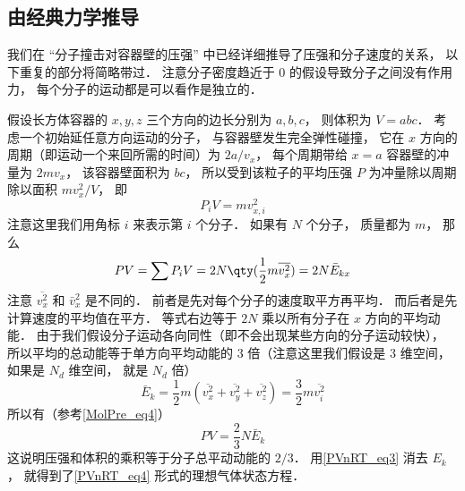 \subsection{由经典力学推导}

我们在 “分子撞击对容器壁的压强” 中已经详细推导了压强和分子速度的关系， 以下重复的部分将简略带过． 注意分子密度趋近于 0 的假设导致分子之间没有作用力， 每个分子的运动都是可以看作是独立的．

假设长方体容器的 $x, y, z$ 三个方向的边长分别为 $a, b, c$， 则体积为  $V = abc$． 考虑一个初始延任意方向运动的分子， 与容器壁发生完全弹性碰撞， 它在 $x$ 方向的周期（即运动一个来回所需的时间）为 $2a/v_x$， 每个周期带给 $x = a$ 容器壁的冲量为 $2m v_x$， 该容器壁面积为 $bc$， 所以受到该粒子的平均压强 $P$ 为冲量除以周期除以面积 $mv_x^2/V$， 即
\begin{equation}
P_i V = mv_{x,i}^2
\end{equation}
注意这里我们用角标 $i$ 来表示第 $i$ 个分子． 如果有 $N$ 个分子， 质量都为 $m$， 那么
\begin{equation}
P V = \sum P_i V = 2 N \qty(\frac12 m \overline {v_x^2}) = 2 N \bar E_{kx}
\end{equation}
注意 $\overline {v_x^2}$ 和 $\bar v_x^2$ 是不同的． 前者是先对每个分子的速度取平方再平均． 而后者是先计算速度的平均值在平方． 等式右边等于 $2N$ 乘以所有分子在 $x$ 方向的平均动能． 由于我们假设分子运动各向同性（即不会出现某些方向的分子运动较快）， 所以平均的总动能等于单方向平均动能的 3 倍（注意这里我们假设是 3 维空间， 如果是 $N_d$ 维空间， 就是 $N_d$ 倍）
\begin{equation}
\bar E_k = \frac{1}{2} m (\overline {v_x^2} + \overline {v_y^2} + \overline {v_z^2}) = \frac{3}{2} m \overline {v_i^2}
\end{equation}
所以有（参考\autoref{MolPre_eq4}）
\begin{equation}
P V = \frac23 N \bar E_k
\end{equation}
这说明压强和体积的乘积等于分子总平动动能的 $2/3$． 用\autoref{PVnRT_eq3} 消去 $E_k$， 就得到了\autoref{PVnRT_eq4} 形式的理想气体状态方程．

